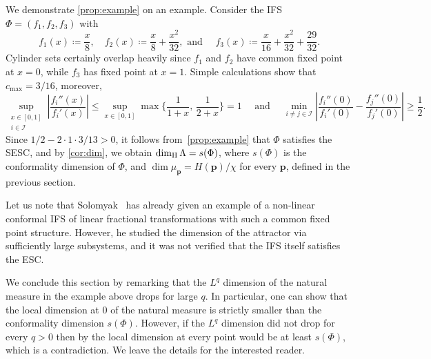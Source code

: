 \documentclass[11pt,]{article}
\def\cref#1{\ref{#1}}%
\theoremstyle{definition}
\theoremstyle{remark}
\newcommand{\0}{\mathbf{0}}
\numberwithin{equation}{section}
\begin{document}
We demonstrate \cref{prop:example} on an example. Consider the IFS $\Phi=(f_1,f_2,f_3)$ with
\begin{equation*}%
f_1(x)\coloneqq \frac{x}{8}, \quad f_2(x)\coloneqq \frac{x}{8} + \frac{x^2}{32}, \text{ and } \quad
f_3(x)\coloneqq \frac{x}{16} + \frac{x^2}{32} + \frac{29}{32}. 
\end{equation*}
Cylinder sets certainly overlap heavily since $f_1$ and $f_2$ have common fixed point at $x=0$,
while $f_3$ has fixed point at $x=1$. Simple calculations show that $c_{\max}=3/16$, moreover,
\begin{equation*}
\sup_{\substack{x\in[0,1] \\ i\in\mathcal{I}}} \left| \frac{f_i''(x)}{f_i'(x)} \right| \leq
\sup_{x\in[0,1]} \max\Big\{\frac{1}{1+x},\, \frac{1}{2+x} \Big\} = 1 \quad\text{ and }\quad
\min_{i\neq j\in\mathcal{I}}\left| \frac{f_i''(0)}{f_i'(0)} - \frac{f_j''(0)}{f_j'(0)} \right| \geq
\frac{1}{2} .
\end{equation*}
Since $1/2-2\cdot 1\cdot 3/13>0$, it follows from~\cref{prop:example} that $\Phi$ satisfies the
SESC, and by \cref{cor:dim}, we obtain $\dim_{\rm H}\Lambda=s(\Phi)$, where $s(\Phi)$ is the
conformality dimension of $\Phi$, and $\dim \mu_{\mathbf{p}} =  H(\mathbf{p})/\chi$ for
every $\mathbf{p}$, defined in the previous section. 

Let us note that Solomyak~\cite{Solomyak24} has already given an example of a non-linear conformal
IFS of linear fractional transformations with such a common fixed point structure.
However, he studied the dimension of the attractor via sufficiently large subsystems, and it was not
verified that the IFS itself satisfies the ESC.

We conclude this section by remarking that the $L^q$ dimension of the natural measure in the example
above drops for large $q$. In particular, one can show that the local dimension at $0$ of the
natural measure is strictly smaller than the conformality dimension $s(\Phi)$. However, if the $L^q$
dimension did not drop for every $q>0$ then by \cite[Lemma~1.7]{Shmerkin_LqSelfSim_Annals} the local
dimension at every point would be at least $s(\Phi)$, which is a contradiction. We leave the details
for the interested reader.
\end{document}
